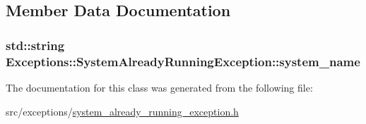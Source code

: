 \subsection{Member Data Documentation}
\hypertarget{class_exceptions_1_1_system_already_running_exception_a914a5cb77c9acbd05862c8927da7ea36}{}
\subsubsection[{system\+\_\+name}]{\setlength{\rightskip}{0pt plus 5cm}std\+::string Exceptions\+::\+System\+Already\+Running\+Exception\+::system\+\_\+name\hspace{0.3cm}{\ttfamily [private]}}\label{class_exceptions_1_1_system_already_running_exception_a914a5cb77c9acbd05862c8927da7ea36}


The documentation for this class was generated from the following file\+:\begin{DoxyCompactItemize}
\item 
src/exceptions/\hyperlink{system__already__running__exception_8h}{system\+\_\+already\+\_\+running\+\_\+exception.\+h}\end{DoxyCompactItemize}

